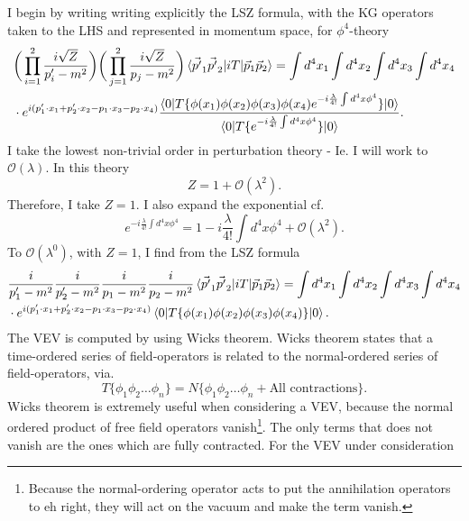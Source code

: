 \begin{example}
\begin{enumerate}
		I begin by writing writing explicitly the LSZ formula, with the KG operators taken to the LHS and represented in momentum space, for $\phi^4$-theory
		\begin{equation}
			\begin{split}
				&\bigg(\prod_{i=1}^{2}\frac{i\sqrt{Z}}{p'_i-m^2}\bigg)\bigg(\prod_{j=1}^{2}\frac{i\sqrt{Z}}{p_j-m^2}\bigg)\braket{\vec{p'}_1\vec{p'}_2|iT|\vec{p}_1\vec{p}_2}=\int d^4x_1\int d^4x_2\int d^4x_3\int d^4x_4\\
				&\cdot e^{i(p'_1\cdot x_1+p'_2\cdot x_2-p_1\cdot x_3-p_2\cdot x_4)}\frac{\braket{0|T\{\phi(x_1)\phi(x_2)\phi(x_3)\phi(x_4)e^{-i\frac{\lambda}{4!}\int d^4x\phi^4}\}|0}}{\braket{0|T\{e^{-i\frac{\lambda}{4!}\int d^4x \phi^4}\}|0}}.
			\end{split}
		\end{equation}  
		I take the lowest non-trivial order in perturbation theory - Ie. I will work to $\mathcal{O}(\lambda)$. In this theory
		\begin{equation}
			Z=1+\mathcal{O}(\lambda^2).
		\end{equation} 
		Therefore, I take $Z=1$. I also expand the exponential cf.
		\begin{equation}
			e^{-i\frac{\lambda}{4!}\int d^4x \phi^4}=1-i\frac{\lambda}{4!}\int d^4x\phi^4+\mathcal{O}(\lambda^2).
		\end{equation} 
		To $\mathcal{O}(\lambda^0)$, with $Z=1$, I find from the LSZ formula
		\begin{equation}
			\begin{split}
				&\frac{i}{p'_1-m^2}\frac{i}{p'_2-m^2}\frac{i}{p_1-m^2}\frac{i}{p_2-m^2}\braket{\vec{p'}_1\vec{p'}_2|iT|\vec{p}_1\vec{p}_2}=\int d^4x_1\int d^4x_2\int d^4x_3\int d^4x_4\\
				&\cdot e^{i(p'_1\cdot x_1+p'_2\cdot x_2-p_1\cdot x_3-p_2\cdot x_4)}\braket{0|T\{\phi(x_1)\phi(x_2)\phi(x_3)\phi(x_4)\}|0}.
			\end{split}
		\end{equation}  
		The VEV is computed by using Wicks theorem. Wicks theorem states that a time-ordered series of field-operators is related to the normal-ordered series of field-operators, via.
		\begin{equation}
			T\{\phi_1\phi_2\dots\phi_n\}=N\{\phi_1\phi_2\dots\phi_n+\text{All contractions}\}.
		\end{equation} 
		Wicks theorem is extremely useful when considering a VEV, because the normal ordered product of free field operators vanish\footnote{Because the normal-ordering operator acts to put the annihilation operators to eh right, they will act on the vacuum and make the term vanish.}. The only terms that does not vanish are the ones which are fully contracted. For the VEV under consideration

\end{enumerate}
\end{example}
